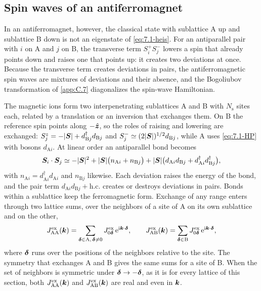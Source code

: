 \subsection{Spin waves of an antiferromagnet}\label{sec:7.1-afm}

In an antiferromagnet, however, the classical state with sublattice A up and sublattice B down is not an eigenstate of \cref{eq:7.1-heis}. For an antiparallel pair with $i$ on A and $j$ on B, the transverse term $S^+_iS^-_j$ lowers a spin that already points down and raises one that points up: it creates two deviations at once. Because the transverse term creates deviations in pairs, the antiferromagnetic spin waves are mixtures of deviations and their absence, and the Bogoliubov transformation of \cref{app:C.7} diagonalizes the spin-wave Hamiltonian.

The magnetic ions form two interpenetrating sublattices A and B with $N_{\mathrm{s}}$ sites each, related by a translation or an inversion that exchanges them. On B the reference spin points along $-\hat{\bm{z}}$, so the roles of raising and lowering are exchanged: $S^z_j = -|\bm{S}| + d^\dagger_{\mathrm{B}j}d_{\mathrm{B}j}$ and $S^-_j \simeq (2|\bm{S}|)^{1/2}d_{\mathrm{B}j}$, while A uses \cref{eq:7.1-HP} with bosons $d_{\mathrm{A}i}$. At linear order an antiparallel bond becomes
\begin{equation*}
  \bm{S}_i\cdot\bm{S}_j \simeq -|\bm{S}|^2 + |\bm{S}|\bigl(n_{\mathrm{A}i} + n_{\mathrm{B}j}\bigr) + |\bm{S}|\bigl(d_{\mathrm{A}i}d_{\mathrm{B}j} + d^\dagger_{\mathrm{A}i}d^\dagger_{\mathrm{B}j}\bigr) ,
\end{equation*}
with $n_{\mathrm{A}i} = d^\dagger_{\mathrm{A}i}d_{\mathrm{A}i}$ and $n_{\mathrm{B}j}$ likewise. Each deviation raises the energy of the bond, and the pair term $d_{\mathrm{A}i}d_{\mathrm{B}j} + \text{h.c.}$ creates or destroys deviations in pairs. Bonds within a sublattice keep the ferromagnetic form. Exchange of any range enters through two lattice sums, over the neighbors of a site of A on its own sublattice and on the other,
\begin{equation}
  J^{\mathrm{ex}}_{\mathrm{AA}}(\bm{k}) = \sum_{\bm{\delta}\in\mathrm{A},\,\bm{\delta}\ne0}J^{\mathrm{ex}}_{0\bm{\delta}}\,\mathrm{e}^{\mathrm{i}\bm{k}\cdot\bm{\delta}}, \qquad
  J^{\mathrm{ex}}_{\mathrm{AB}}(\bm{k}) = \sum_{\bm{\delta}\in\mathrm{B}}J^{\mathrm{ex}}_{0\bm{\delta}}\,\mathrm{e}^{\mathrm{i}\bm{k}\cdot\bm{\delta}} ,
  \label{eq:D.19-Jk}
\end{equation}
where $\bm{\delta}$ runs over the positions of the neighbors relative to the site. The symmetry that exchanges A and B gives the same sums for a site of B. When the set of neighbors is symmetric under $\bm{\delta} \to -\bm{\delta}$, as it is for every lattice of this section, both $J^{\mathrm{ex}}_{\mathrm{AA}}(\bm{k})$ and $J^{\mathrm{ex}}_{\mathrm{AB}}(\bm{k})$ are real and even in $\bm{k}$.


